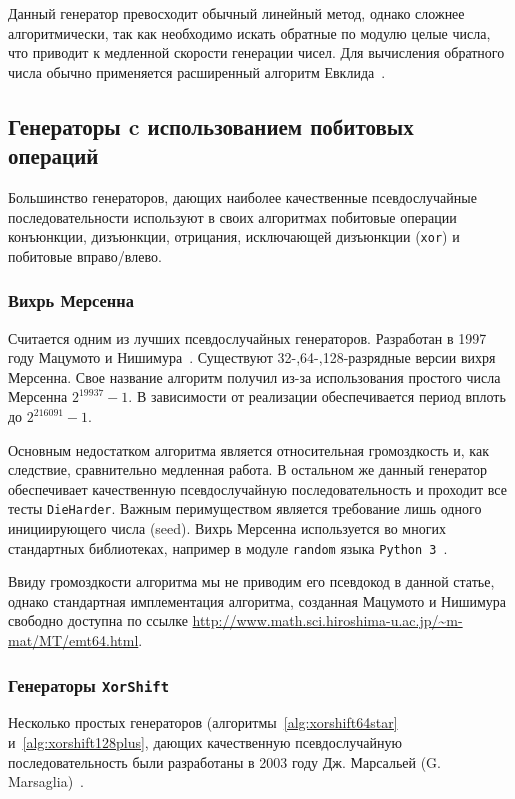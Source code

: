 \documentclass[%
floatfix,
showkeys,
nofootinbib, %
superscriptaddress, %
]{revtex4-1}
\begin{document}
Данный генератор превосходит обычный линейный метод, однако сложнее
алгоритмически, так как необходимо искать обратные по модулю целые
числа, что приводит к медленной скорости генерации чисел. Для
вычисления обратного числа обычно применяется расширенный алгоритм
Евклида~\cite[\S 4.3.2]{L_DKnuth:2004:ru}.

\subsection{Генераторы c использованием побитовых операций}

Большинство генераторов, дающих наиболее качественные псевдослучайные
последовательности используют в своих алгоритмах побитовые операции
конъюнкции, дизъюнкции, отрицания, исключающей дизъюнкции
(\texttt{xor}) и побитовые вправо/влево.

\subsubsection{Вихрь Мерсенна}

Считается одним из лучших псевдослучайных генераторов. Разработан в
1997 году Мацумото и Нишимура~\cite{L_Matsumoto:1998:MTE}. Существуют
32-,64-,128-разрядные версии вихря Мерсенна. Свое название алгоритм
получил из-за использования простого числа Мерсенна $2^{19937}-1$. В
зависимости от реализации обеспечивается период вплоть до
$2^{216091}-1$.

Основным недостатком алгоритма является относительная громоздкость и,
как следствие, сравнительно медленная работа. В остальном же данный
генератор обеспечивает качественную псевдослучайную последовательность
и проходит все тесты \verb|DieHarder|. Важным перимуществом является
требование лишь одного инициирующего числа (seed). Вихрь Мерсенна
используется во многих стандартных библиотеках, например в модуле
\texttt{random} языка \texttt{Python 3}~\cite{L_Python3:3.5.1}.

Ввиду громоздкости алгоритма мы не приводим его псевдокод в данной
статье, однако стандартная имплементация алгоритма, созданная Мацумото
и Нишимура свободно доступна по ссылке
\url{http://www.math.sci.hiroshima-u.ac.jp/~m-mat/MT/emt64.html}.

\subsubsection{Генераторы \texttt{XorShift}}

Несколько простых генераторов (алгоритмы~\ref{alg:xorshift64star}
и~\ref{alg:xorshift128plus}, дающих качественную псевдослучайную
последовательность были разработаны в 2003 году Дж. Марсальей
(G. Marsaglia)~\cite{L_xorshift:2003, L_xorshift:2005}.
\end{document}
